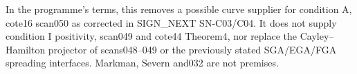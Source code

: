 In the programme's terms, this removes a possible curve supplier for
condition A, cote16 scan050 as corrected in SIGN\_NEXT SN-C03/C04.
It does not supply condition I positivity, scan049 and cote44 Theorem4,
nor replace the Cayley--Hamilton projector of scans048--049 or the
previously stated SGA/EGA/FGA spreading interfaces. Markman, Severn
and032 are not premises.
